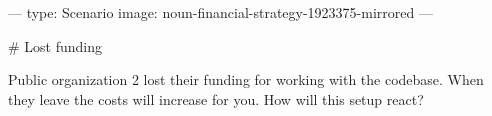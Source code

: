 ---
type: Scenario
image: noun-financial-strategy-1923375-mirrored
---

# Lost funding

Public organization 2 lost their funding for working with the codebase. When they leave the costs will increase for you. How will this setup react?
